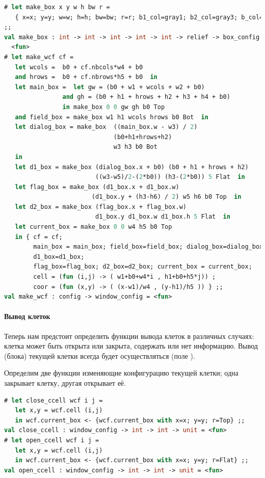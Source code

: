 \begin{lstlisting}[language=OCaml]
# let make_box x y w h bw r =
   { x=x; y=y; w=w; h=h; bw=bw; r=r; b1_col=gray1; b2_col=gray3; b_col=gray2 } 
;;
val make_box : int -> int -> int -> int -> int -> relief -> box_config =
  <fun>
# let make_wcf cf = 
   let wcols =  b0 + cf.nbcols*w4 + b0 
   and hrows =  b0 + cf.nbrows*h5 + b0  in
   let main_box =  let gw = (b0 + w1 + wcols + w2 + b0) 
                and gh = (b0 + h1 + hrows + h2 + h3 + h4 + b0)
                in make_box 0 0 gw gh b0 Top
   and field_box = make_box w1 h1 wcols hrows b0 Bot  in
   let dialog_box = make_box  ((main_box.w - w3) / 2)
                              (b0+h1+hrows+h2)
                              w3 h3 b0 Bot
   in 
   let d1_box = make_box (dialog_box.x + b0) (b0 + h1 + hrows + h2)
                         ((w3-w5)/2-(2*b0)) (h3-(2*b0)) 5 Flat  in
   let flag_box = make_box (d1_box.x + d1_box.w) 
                        (d1_box.y + (h3-h6) / 2) w5 h6 b0 Top  in 
   let d2_box = make_box (flag_box.x + flag_box.w) 
                         d1_box.y d1_box.w d1_box.h 5 Flat  in
   let current_box = make_box 0 0 w4 h5 b0 Top
   in { cf = cf; 
        main_box = main_box; field_box=field_box; dialog_box=dialog_box;
        d1_box=d1_box; 
        flag_box=flag_box; d2_box=d2_box; current_box = current_box;
        cell = (fun (i,j) -> ( w1+b0+w4*i , h1+b0+h5*j)) ;
        coor = (fun (x,y) -> ( (x-w1)/w4 , (y-h1)/h5 )) } ;;
val make_wcf : config -> window_config = <fun>
\end{lstlisting}

\paragraph{Вывод клеток}

Теперь нам предстоит определить функции вывода клеток в различных случаях: 
клетка может быть открыта или закрыта, содержать или нет информацию. Вывод 
(блока) текущей клетки всегда будет осуществляться (поле ).

Определим две функции изменяющие конфигурацию текущей клетки; одна закрывает 
клетку, другая открывает её.

\begin{lstlisting}[language=OCaml]
# let close_ccell wcf i j =
   let x,y = wcf.cell (i,j)
   in wcf.current_box <- {wcf.current_box with x=x; y=y; r=Top} ;;
val close_ccell : window_config -> int -> int -> unit = <fun>
# let open_ccell wcf i j =
   let x,y = wcf.cell (i,j)
   in wcf.current_box <- {wcf.current_box with x=x; y=y; r=Flat} ;;
val open_ccell : window_config -> int -> int -> unit = <fun>
\end{lstlisting}

